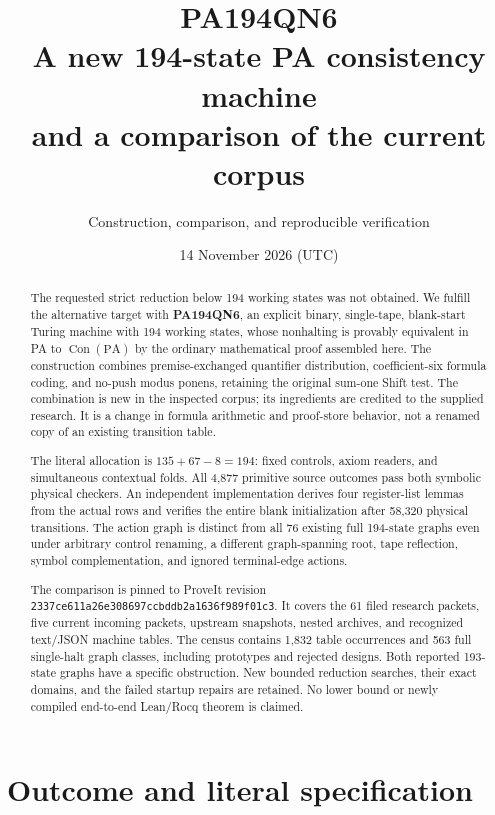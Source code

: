 \documentclass[11pt,letterpaper]{article}
\title{PA194QN6\\[4pt]\Large A new 194-state PA consistency machine\\and a comparison of the current corpus}
\author{Construction, comparison, and reproducible verification}
\date{14 November 2026 (UTC)}
\newcommand{\PA}{\mathrm{PA}}
\newcommand{\Con}{\operatorname{Con}}
\begin{document}
\maketitle
\begin{abstract}
The requested strict reduction below 194 working states was not obtained.
We fulfill the alternative target with \textbf{PA194QN6}, an explicit
binary, single-tape, blank-start Turing machine with 194 working states,
whose nonhalting is provably equivalent in PA to $\Con(\PA)$ by the
ordinary mathematical proof assembled here. The construction combines
premise-exchanged quantifier distribution, coefficient-six formula coding,
and no-push modus ponens, retaining the original sum-one Shift test.
The combination is new in the inspected corpus; its ingredients are credited
to the supplied research. It is a change in formula arithmetic and proof-store
behavior, not a renamed copy of an existing transition table.

The literal allocation is $135+67-8=194$: fixed controls, axiom readers,
and simultaneous contextual folds. All 4,877 primitive source outcomes
pass both symbolic physical checkers. An independent implementation derives
four register-list lemmas from the actual rows and verifies the entire
blank initialization after 58,320 physical transitions. The action graph
is distinct from all 76 existing full 194-state graphs even under arbitrary
control renaming, a different graph-spanning root, tape reflection, symbol
complementation, and ignored terminal-edge actions.

The comparison is pinned to ProveIt revision
\texttt{2337ce611a26e308697ccbddb2a1636f989f01c3}. It covers the 61 filed
research packets, five current incoming packets, upstream snapshots, nested
archives, and recognized text/JSON machine tables. The census contains
1,832 table occurrences and 563 full single-halt graph classes, including
prototypes and rejected designs. Both reported 193-state graphs have a
specific obstruction. New bounded reduction searches, their exact domains,
and the failed startup repairs are retained. No lower bound or newly
compiled end-to-end Lean/Rocq theorem is claimed.
\end{abstract}
\clearpage
\tableofcontents
\clearpage

\section{Outcome and literal specification}
\label{sec:outcome}
\end{document}
